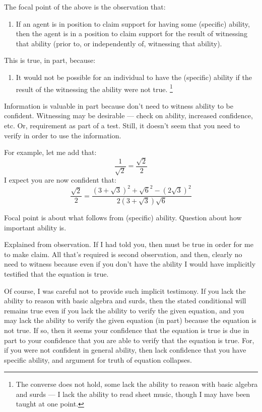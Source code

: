 \begin{note}[Focus]
  The focal point of the above is the observation that:
  \begin{enumerate}[label=(O\arabic*)]
  \item If an agent is in position to claim support for having some (specific) ability, then the agent is in a position to claim support for the result of witnessing that ability (prior to, or independently of, witnessing that ability).
  \end{enumerate}
  This is true, in part, because:
  \begin{enumerate}[label=(O\arabic*), resume]
  \item It would not be possible for an individual to have the (specific) ability if the result of the witnessing the ability were not true.\nolinebreak
    \footnote{The converse does not hold, some lack the ability to reason with basic algebra and surds --- I lack the ability to read sheet music, though I may have been taught at one point.}
  \end{enumerate}
  Information is valuable in part because don't need to witness ability to be confident.
  Witnessing may be desirable --- check on ability, increased confidence, etc. Or, requirement as part of a test.
  Still, it doesn't seem that you need to verify in order to use the information.

  For example, let me add that:
  \[\frac{1}{\sqrt{2}} = \frac{\sqrt{2}}{2}\]
  I expect you are now confident that:
  \[\frac{\sqrt{2}}{2} = \frac{(3 + \sqrt{3})^{2} + \sqrt{6}^{2} - (2\sqrt{3})^{2}}{2(3 + \sqrt{3})\sqrt{6}}\]
\end{note}

\begin{note}
  Focal point is about what follows from (specific) ability.
  Question about how important ability is.

  Explained from observation.
  If I had told you, then must be true in order for me to make claim.
  All that's required is second observation, and then, clearly no need to witness because even if you don't have the ability I would have implicitly testified that the equation is true.

  Of course, I was careful not to provide such implicit testimony.
  If you lack the ability to reason with basic algebra and surds, then the stated conditional will remains true even if you lack the ability to verify the given equation, and you may lack the ability to verify the given equation (in part) because the equation is not true.
  If so, then it seems your confidence that the equation is true is due in part to your confidence that you are able to verify that the equation is true.
  For, if you were not confident in general ability, then lack confidence that you have specific ability, and argument for truth of equation collapses.
\end{note}

